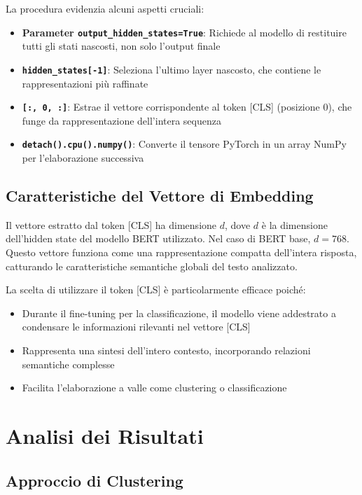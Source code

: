 \documentclass{article}
\begin{document}
La procedura evidenzia alcuni aspetti cruciali:

\begin{itemize}
    \item \textbf{Parameter \texttt{output\_hidden\_states=True}}: Richiede al modello di restituire tutti gli stati nascosti, non solo l'output finale
    \item \textbf{\texttt{hidden\_states[-1]}}: Seleziona l'ultimo layer nascosto, che contiene le rappresentazioni più raffinate
    \item \textbf{\texttt{[:, 0, :]}}: Estrae il vettore corrispondente al token [CLS] (posizione 0), che funge da rappresentazione dell'intera sequenza
    \item \textbf{\texttt{detach().cpu().numpy()}}: Converte il tensore PyTorch in un array NumPy per l'elaborazione successiva
\end{itemize}

\subsection{Caratteristiche del Vettore di Embedding}

Il vettore estratto dal token [CLS] ha dimensione \(d\), dove \(d\) è la dimensione dell'hidden state del modello BERT utilizzato. Nel caso di BERT base, \(d = 768\). Questo vettore funziona come una rappresentazione compatta dell'intera risposta, catturando le caratteristiche semantiche globali del testo analizzato.

La scelta di utilizzare il token [CLS] è particolarmente efficace poiché:

\begin{itemize}
    \item Durante il fine-tuning per la classificazione, il modello viene addestrato a condensare le informazioni rilevanti nel vettore [CLS]
    \item Rappresenta una sintesi dell'intero contesto, incorporando relazioni semantiche complesse
    \item Facilita l'elaborazione a valle come clustering o classificazione
\end{itemize}

\section{Analisi dei Risultati}

\subsection{Approccio di Clustering}
\end{document}

